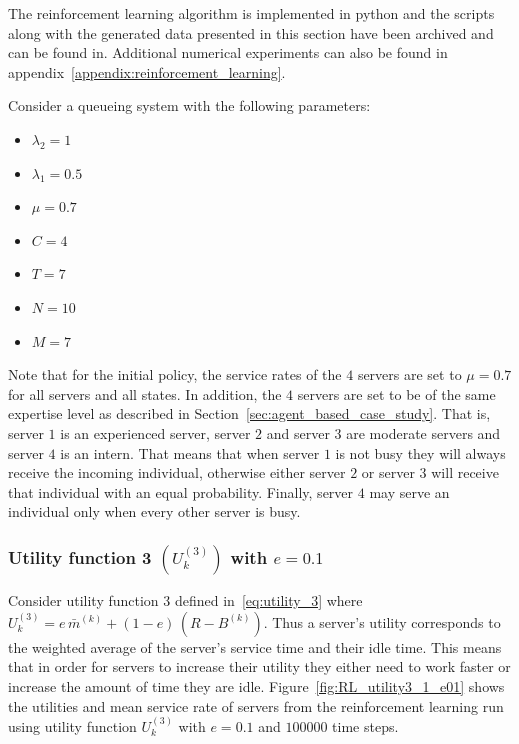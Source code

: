 The reinforcement learning algorithm is implemented in python and the scripts
along with the generated data presented in this section have been archived and
can be found in.
Additional numerical experiments can also be found in
appendix~\ref{appendix:reinforcement_learning}.

Consider a queueing system with the following parameters:

\begin{multicols}{4}
    \begin{itemize}
        \item \(\lambda_2 = 1\)
        \item \(\lambda_1 = 0.5 \)
        \item \(\mu = 0.7\)
        \item \(C = 4\)
        \item \(T = 7\)
        \item \(N = 10\)
        \item \(M = 7 \)
    \end{itemize}
\end{multicols}

Note that for the initial policy, the service rates of the \(4\) servers are
set to \(\mu = 0.7\) for all servers and all states.
In addition, the \(4\) servers are set to be of the same expertise level as
described in Section~\ref{sec:agent_based_case_study}.
That is, server \(1\) is an experienced server, server \(2\) and server
\(3\) are moderate servers and server \(4\) is an intern.
That means that when server \(1\) is not busy they will always receive the
incoming individual, otherwise either server \(2\) or server \(3\) will
receive that individual with an equal probability.
Finally, server \(4\) may serve an individual only when every other server is
busy.


\subsubsection{Utility function 3 \((U_k^{(3)})\) with \(e = 0.1\)}
\label{sec:utility_3_results}

Consider utility function 3 defined in~\eqref{eq:utility_3} where
\(U_k^{(3)} = e \, \bar{m}^{(k)} + (1 - e) \, (R - B^{(k)})\).
Thus a server's utility corresponds to the weighted average of the server's
service time and their idle time.
This means that in order for servers to increase their utility they either
need to work faster or increase the amount of time they are idle.
Figure~\ref{fig:RL_utility3_1_e01} shows the utilities and mean service rate
of servers from the reinforcement learning run using utility function
\(U_k^{(3)}\) with \(e = 0.1\) and \(100000\) time steps.

